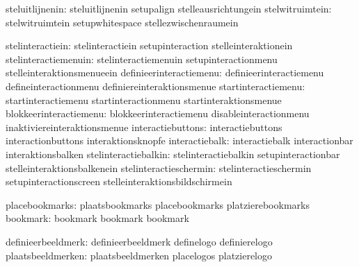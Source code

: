               steluitlijnenin:  steluitlijnenin              setupalign
                                stelleausrichtungein
              stelwitruimtein:  stelwitruimtein              setupwhitespace
                                stellezwischenraumein

             stelinteractiein:  stelinteractiein             setupinteraction
                                stelleinteraktionein
         stelinteractiemenuin:  stelinteractiemenuin         setupinteractionmenu
                                stelleinteraktionsmenueein
      definieerinteractiemenu:  definieerinteractiemenu      defineinteractionmenu
                                definiereinteraktionsmenue
          startinteractiemenu:  startinteractiemenu          startinteractionmenu
                                startinteraktionsmenue
       blokkeerinteractiemenu:  blokkeerinteractiemenu       disableinteractionmenu
                                inaktiviereinteraktionsmenue
            interactiebuttons:  interactiebuttons            interactionbuttons
                                interaktionsknopfe
               interactiebalk:  interactiebalk               interactionbar
                                interaktionsbalken
         stelinteractiebalkin:  stelinteractiebalkin         setupinteractionbar
                                stelleinteraktionsbalkenein
       stelinteractieschermin:  stelinteractieschermin       setupinteractionscreen
                                stelleinteraktionsbildschirmein

               placebookmarks:  plaatsbookmarks              placebookmarks
                                platzierebookmarks 
                     bookmark:  bookmark                     bookmark
                                bookmark %

           definieerbeeldmerk:  definieerbeeldmerk           definelogo
                                definierelogo
            plaatsbeeldmerken:  plaatsbeeldmerken            placelogos
                                platzierelogo

